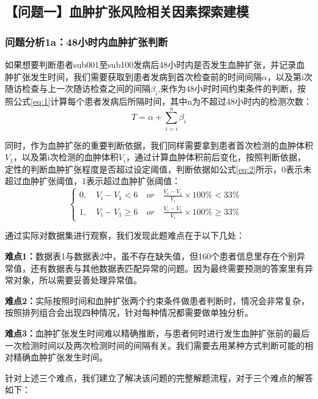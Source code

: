 \documentclass[bwprint]{gmcmthesis}
\begin{document}
		\subsection{【问题一】血肿扩张风险相关因素探索建模}
			\subsubsection{问题分析1a：48小时内血肿扩张判断}\label{sec:4.1.1}
				如果想要判断患者sub001至sub100发病后48小时内是否发生血肿扩张，并记录血肿扩张发生时间，我们需要获取到患者发病到首次检查前的时间间隔$\alpha$，以及第i次随访检查与上一次随访检查之间的间隔$\beta_i$,来作为48小时时间约束条件的判断，按照公式\ref{eq:1}计算每个患者发病后所隔时间，其中n为不超过48小时内的检测次数：
				\begin{equation}
					\label{eq:1}
					T=\alpha+\sum_{i=i}^{n}\beta_{i}
				\end{equation}
				
				同时，作为血肿扩张的重要判断依据，我们同样需要拿到患者首次检测的血肿体积$V_1$，以及第i次检测的血肿体积$V_i$，通过计算血肿体积前后变化，按照判断依据，定性的判断血肿扩张程度是否超过设定阈值，判断依据如公式\ref{eq:2}所示，0表示未超过血肿扩张阈值，1表示超过血肿扩张阈值：
				\begin{equation}
					\label{eq:2}
					\begin{cases}0,\quad V_{\mathrm{i}}-V_{1}<6\quad or\quad \frac{V_{i}-V_{1}}{V_{i}}\times100\%<33\%\\1,\quad V_{\mathrm{i}}-V_{1}\ge 6\quad or\quad \frac{V_{i}-V_{1}}{V_{i}}\times100\%\ge 33\%&\end{cases}
				\end{equation}
				
				通过实际对数据集进行观察，我们发现此题难点在于以下几处：
				
				\textbf{难点1：}数据表1与数据表2中，虽不存在缺失值，但160个患者信息里存在个别异常值，还有数据表与其他数据表匹配异常的问题。因为最终需要预测的答案里有异常对象，所以需要妥善处理异常值。
				
				\textbf{难点2：}实际按照时间和血肿扩张两个约束条件做患者判断时，情况会非常复杂，按照排列组合会出现四种情况，针对每种情况都需要做单独分析。
				
				\textbf{难点3：}血肿扩张发生时间难以精确推断，与患者何时进行发生血肿扩张前的最后一次检测时间以及两次检测时间的间隔有关。我们需要去用某种方式判断可能的相对精确血肿扩张发生时间。
				
				针对上述三个难点，我们建立了解决该问题的完整解题流程，对于三个难点的解答如下：
				
\end{document}
